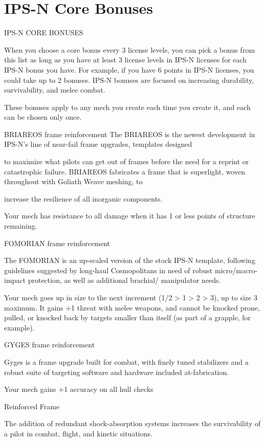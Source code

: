 \section{IPS-N Core Bonuses}


                                        IPS-N CORE BONUSES

When you choose a core bonus every 3 license levels, you can pick a bonus from this list as long
as you have at least 3 license levels in IPS-N licenses for each IPS-N bonus you have. For
example, if you have 6 points in IPS-N licenses, you could take up to 2 bonuses. IPS-N bonuses
are focused on increasing durability, survivability, and melee combat.


These bonuses apply to any mech you create each time you create it, and each can be chosen
only once.


BRIAREOS frame reinforcement
The BRIAREOS is the newest development in IPS-N’s line of near-fail frame upgrades, templates designed

to maximize what pilots can get out of frames before the need for a reprint or catastrophic failure.
BRIAREOS fabricates a frame that is superlight, woven throughout with Goliath Weave meshing, to

increase the resilience of all inorganic components.

Your mech has resistance to all damage when it has 1 or less points of structure remaining.


FOMORIAN frame reinforcement

The FOMORIAN is an up-scaled version of the stock IPS-N template, following guidelines suggested by
long-haul Cosmopolitans in need of robust micro/macro-impact protection, as well as additional brachial/
manipulator needs.

Your mech goes up in size to the next increment (1/2 > 1 > 2 > 3), up to size 3 maximum. It gains
+1 threat with melee weapons, and cannot be knocked prone, pulled, or knocked back by
targets smaller than itself (as part of a grapple, for example).


GYGES frame reinforcement

Gyges is a frame upgrade built for combat, with finely tuned stabilizers and a robust suite of targeting
software and hardware included at-fabrication.

Your mech gains +1 accuracy on all hull checks


Reinforced Frame

The addition of redundant shock-absorption systems increases the survivability of a pilot in combat, flight,
and kinetic situations.

